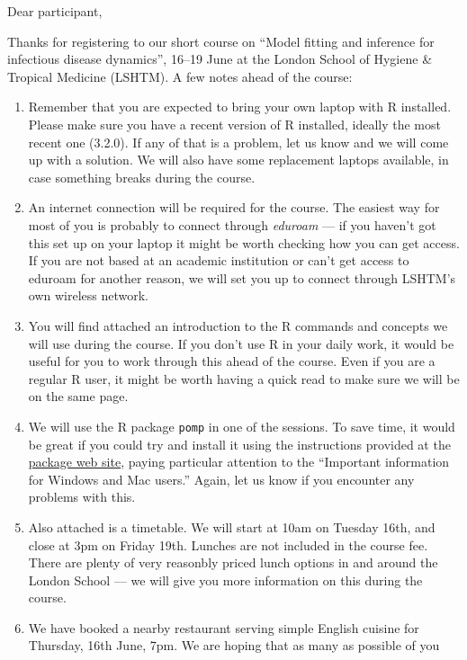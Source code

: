 \documentclass[paper=a4, 11pt]{scrlttr2}
\begin{document}
\begin{letter}{}
\opening{Dear participant,}
Thanks for registering to our short course on ``Model fitting and
inference for infectious disease dynamics'', 16--19 June at the London
School of Hygiene \& Tropical Medicine (LSHTM). A few notes ahead of
the course:

\begin{enumerate}
\item Remember that you are expected to bring your own laptop with R
installed. Please make sure you have a recent version of R installed,
ideally the most recent one (3.2.0). If any of that is a problem, let us know
and we will come up with a solution. We will also have some replacement laptops
available, in case something breaks during the course.
\item An internet connection will be required for the course. The easiest
way for most of you is probably to connect through \emph{eduroam} --- if you
haven't got this set up on your laptop it might be worth checking how you
can get access. If you are not based at an academic institution or can't
get access to eduroam for another reason, we will set you up to connect
through LSHTM's own wireless network.
\item You will find attached an introduction to the R commands and concepts
we will use during the course. If you don't use R in your daily work, it
would be useful for you to work through this ahead of the course. Even
if you are a regular R user, it might be worth having a quick read to
make sure we will be on the same page.
\item We will use the R package \texttt{pomp} in one of the
  sessions. To save time, it would be great if you could try and
  install it using the instructions provided at the 
  \href{http://pomp.r-forge.r-project.org/vignettes/getting_started.html#installing-the-package}{package web site},
  paying particular attention to the ``Important information for
  Windows and Mac users.'' Again, let us know if you encounter any
  problems with this.
\item Also attached is a timetable. We will start at 10am on Tuesday 16th,
and close at 3pm on Friday 19th. Lunches are not included in the
course fee. There are plenty of very reasonbly priced lunch options in
and around the London School --- we will give you more information on
this during the course.
\item We have booked a nearby restaurant serving simple English cuisine for
Thursday, 16th June, 7pm. We are hoping that as many as possible of you

\end{enumerate}
\end{letter}
\end{document}
